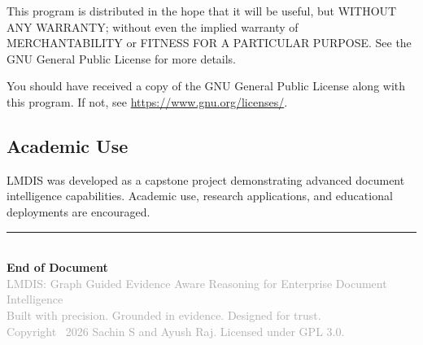 \documentclass[11pt,a4paper]{article}
\begin{document}
This program is distributed in the hope that it will be useful, but WITHOUT ANY WARRANTY; without even the implied warranty of MERCHANTABILITY or FITNESS FOR A PARTICULAR PURPOSE. See the GNU General Public License for more details.

You should have received a copy of the GNU General Public License along with this program. If not, see \url{https://www.gnu.org/licenses/}.

\subsection{Academic Use}

LMDIS was developed as a capstone project demonstrating advanced document intelligence capabilities. Academic use, research applications, and educational deployments are encouraged.

\vspace{2cm}

\begin{center}
    \rule{0.5\textwidth}{1pt}\\[0.5cm]
    \textcolor{primary}{\textbf{End of Document}}\\[0.3cm]
    \textcolor{darkgray}{\small LMDIS: Graph Guided Evidence Aware Reasoning for Enterprise Document Intelligence}\\[0.3cm]
    \textcolor{darkgray}{\small Built with precision. Grounded in evidence. Designed for trust.}\\[0.3cm]
    \textcolor{darkgray}{\small Copyright \textcopyright\ 2026 Sachin S and Ayush Raj. Licensed under GPL 3.0.}
\end{center}
\end{document}
